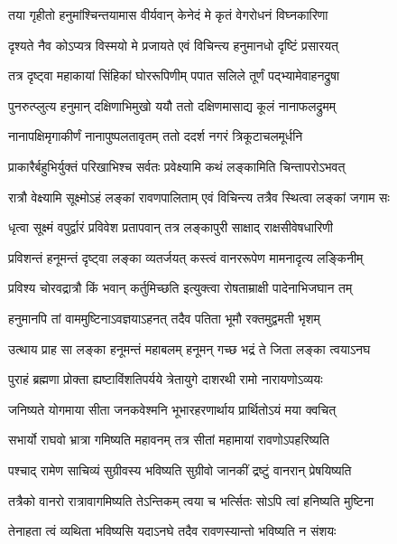 \twolineshloka
{तया गृहीतो हनुमांश्चिन्तयामास वीर्यवान्}
{केनेदं मे कृतं वेगरोधनं विघ्नकारिणा} %

\twolineshloka
{दृश्यते नैव कोऽप्यत्र विस्मयो मे प्रजायते}
{एवं विचिन्त्य हनुमानधो दृष्टिं प्रसारयत्} %

\twolineshloka
{तत्र दृष्ट्वा महाकायां सिंहिकां घोररूपिणीम्}
{पपात सलिले तूर्णं पद्भ्यामेवाहनद्रुषा} %

\twolineshloka
{पुनरुत्प्लुत्य हनुमान् दक्षिणाभिमुखो ययौ}
{ततो दक्षिणमासाद्य कूलं नानाफलद्रुमम्} %

\twolineshloka
{नानापक्षिमृगाकीर्णं नानापुष्पलतावृतम्}
{ततो ददर्श नगरं त्रिकूटाचलमूर्धनि} %

\twolineshloka
{प्राकारैर्बहुभिर्युक्तं परिखाभिश्च सर्वतः}
{प्रवेक्ष्यामि कथं लङ्कामिति चिन्तापरोऽभवत्} %

\twolineshloka
{रात्रौ वेक्ष्यामि सूक्ष्मोऽहं लङ्कां रावणपालिताम्}
{एवं विचिन्त्य तत्रैव स्थित्वा लङ्कां जगाम सः} %

\twolineshloka
{धृत्वा सूक्ष्मं वपुर्द्वारं प्रविवेश प्रतापवान्}
{तत्र लङ्कापुरी साक्षाद् राक्षसीवेषधारिणी} %

\twolineshloka
{प्रविशन्तं हनूमन्तं दृष्ट्वा लङ्का व्यतर्जयत्}
{कस्त्वं वानररूपेण मामनादृत्य लङ्किनीम्} %

\twolineshloka
{प्रविश्य चोरवद्रात्रौ किं भवान् कर्तुमिच्छति}
{इत्युक्त्वा रोषताम्राक्षी पादेनाभिजघान तम्} %

\twolineshloka
{हनुमानपि तां वाममुष्टिनाऽवज्ञयाऽहनत्}
{तदैव पतिता भूमौ रक्तमुद्वमती भृशम्} %

\twolineshloka
{उत्थाय प्राह सा लङ्का हनूमन्तं महाबलम्}
{हनूमन् गच्छ भद्रं ते जिता लङ्का त्वयाऽनघ} %

\twolineshloka
{पुराहं ब्रह्मणा प्रोक्ता ह्यष्टाविंशतिपर्यये}
{त्रेतायुगे दाशरथी रामो नारायणोऽव्ययः} %

\twolineshloka
{जनिष्यते योगमाया सीता जनकवेश्मनि}
{भूभारहरणार्थाय प्रार्थितोऽयं मया क्वचित्} %

\twolineshloka
{सभार्यो राघवो भ्रात्रा गमिष्यति महावनम्}
{तत्र सीतां महामायां रावणोऽपहरिष्यति} %

\twolineshloka
{पश्चाद् रामेण साचिव्यं सुग्रीवस्य भविष्यति}
{सुग्रीवो जानकीं द्रष्टुं वानरान् प्रेषयिष्यति} %

\twolineshloka
{तत्रैको वानरो रात्रावागमिष्यति तेऽन्तिकम्}
{त्वया च भर्त्सितः सोऽपि त्वां हनिष्यति मुष्टिना} %

\twolineshloka
{तेनाहता त्वं व्यथिता भविष्यसि यदाऽनघे}
{तदैव रावणस्यान्तो भविष्यति न संशयः} %

